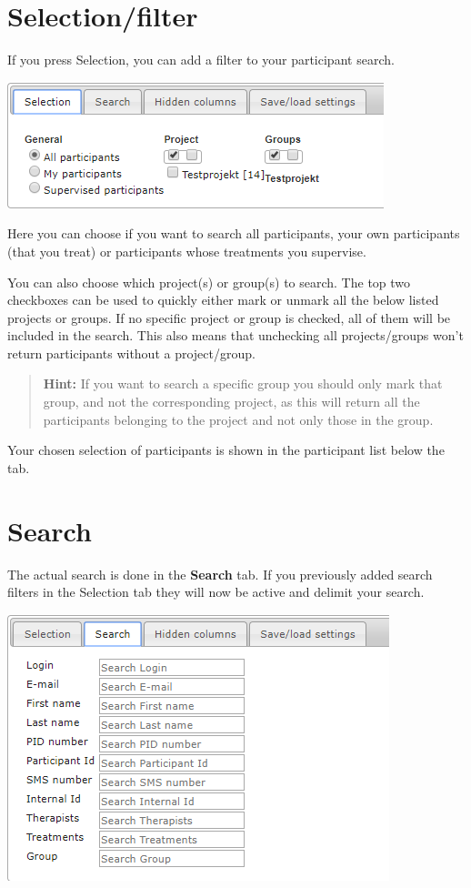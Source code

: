 \documentclass[]{book}
\begin{document}
\hypertarget{selectionfilter}{%
\section{Selection/filter}\label{selectionfilter}}

If you press Selection, you can add a filter to your participant search.

\includegraphics{images/selection-filter.png}

Here you can choose if you want to search all participants, your own participants (that you treat) or participants whose treatments you supervise.

You can also choose which project(s) or group(s) to search. The top two checkboxes can be used to quickly either mark or unmark all the below listed projects or groups. If no specific project or group is checked, all of them will be included in the search. This also means that unchecking all projects/groups won't return participants without a project/group.

\begin{quote}
\textbf{Hint:} If you want to search a specific group you should only mark that group, and not the corresponding project, as this will return all the participants belonging to the project and not only those in the group.
\end{quote}

Your chosen selection of participants is shown in the participant list below the tab.

\hypertarget{search}{%
\section{Search}\label{search}}

The actual search is done in the \textbf{Search} tab. If you previously added search filters in the Selection tab they will now be active and delimit your search.

\includegraphics{images/search.png}
\end{document}
